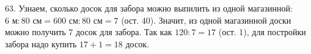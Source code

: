 63. Узнаем, сколько досок для забора можно выпилить из одной магазинной: $6\text{ м}:80\text{ см}=600\text{ см}:80\text{ см}=7$ (ост. 40). Значит, из одной магазинной доски можно получить 7 досок для забора. Так как $120:7=17$ (ост. 1), для постройки забора надо купить $17+1=18$ досок.\\
